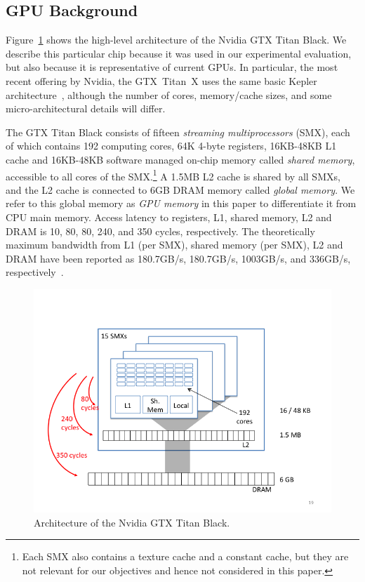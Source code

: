 \subsection{GPU Background}  \label{GPUBackground}

Figure~\ref{Nvidia680Arch} shows the high-level architecture of the Nvidia GTX Titan Black.
We describe this particular chip because it was used in our experimental evaluation, but also
because it is representative of current GPUs.
In particular, the most recent offering by Nvidia, the GTX~Titan~X uses the same basic Kepler
architecture~\cite{nvidia780}, although the number of cores, memory/cache sizes, and some
micro-architectural details will differ.

The GTX Titan Black consists of fifteen \emph{streaming multiprocessors} (SMX), 
each of which contains 192 computing cores, 64K 4-byte registers, 16KB-48KB L1 cache and 16KB-48KB
software managed on-chip memory called \emph{shared memory}, accessible to all cores of the
SMX.\footnote{ 
	Each SMX also contains a texture cache and a constant cache, 
	but they are not relevant for our objectives and hence not considered in this paper.}
A 1.5MB L2 cache is shared by all SMXs, and the L2 cache is connected to
6GB DRAM memory called \emph{global memory}.
We refer to this global memory as \emph{GPU memory} in this paper 
to differentiate it from CPU main memory.
Access latency to registers, L1, shared memory, L2 and DRAM is 10, 80, 80, 240, and 350 cycles,
respectively.
The theoretically maximum bandwidth from L1 (per SMX), shared memory (per SMX), L2 and DRAM have been reported as 180.7GB/s, 180.7GB/s,
1003GB/s, and 336GB/s, respectively~\cite{insideKepler}.


\begin{figure}
\center
\includegraphics[scale=0.3]{Nvidia680Arch.png}
\caption{\footnotesize\textnormal{Architecture of the Nvidia GTX Titan Black.}}
\label{Nvidia680Arch}
\end{figure}

